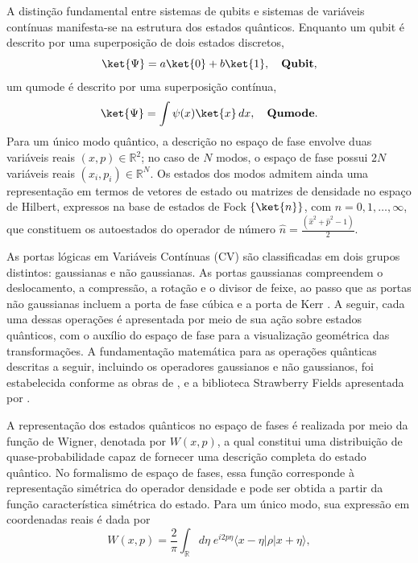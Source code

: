 A distinção fundamental entre sistemas de qubits e sistemas de variáveis contínuas manifesta-se na estrutura dos estados quânticos. Enquanto um qubit é descrito por uma superposição de dois estados discretos,
\begin{equation*}
    \ket{\Psi} = a\ket{0} + b\ket{1}, \quad \textbf{Qubit},
\end{equation*}
um qumode é descrito por uma superposição contínua,
\begin{equation*}
    \ket{\Psi} = \int \psi(x)\ket{x}\, dx, \quad \textbf{Qumode}.
\end{equation*}
Para um único modo quântico, a descrição no espaço de fase envolve duas variáveis reais $(x, p) \in \mathbb{R}^{2}$; no caso de $N$ modos, o espaço de fase possui $2N$ variáveis reais $(x_i, p_i) \in \mathbb{R}^{N}$. Os estados dos modos admitem ainda uma representação em termos de vetores de estado ou matrizes de densidade no espaço de Hilbert, expressos na base de estados de Fock $\{\ket{n}\}$, com $n = 0, 1, \ldots, \infty$, que constituem os autoestados do operador de número $\displaystyle\hat{n} = \frac{(\hat{x}^2 + \hat{p}^2 - 1)}{2}$.

As portas lógicas em Variáveis Contínuas (CV) são classificadas em dois grupos distintos: gaussianas e não gaussianas. As portas gaussianas compreendem o deslocamento, a compressão, a rotação e o divisor de feixe, ao passo que as portas não gaussianas incluem a porta de fase cúbica e a porta de Kerr \cite{fukui2022building, sharma2020characterizing, weedbrook2012gaussian, serafini_quantum_2023}. A seguir, cada uma dessas operações é apresentada por meio de sua ação sobre estados quânticos, com o auxílio do espaço de fase para a visualização geométrica das transformações. A fundamentação matemática para as operações quânticas descritas a seguir, incluindo os operadores gaussianos e não gaussianos, foi estabelecida conforme as obras de \textcite{de_lima_redes_nodate}, \textcite{serafini_quantum_2023} e a biblioteca Strawberry Fields apresentada por \textcite{killoran_strawberry_2019}.

A representação dos estados quânticos no espaço de fases é realizada por meio da função de Wigner, denotada por $W(x,p)$, a qual constitui uma distribuição de quase-probabilidade capaz de fornecer uma descrição completa do estado quântico. No formalismo de espaço de fases, essa função corresponde à representação simétrica do operador densidade e pode ser obtida a partir da função característica simétrica do estado. Para um único modo, sua expressão em coordenadas reais é dada por
\begin{equation}
W(x,p)=\frac{2}{\pi}\int_{\mathbb{R}} d\eta \; e^{i2p\eta} \langle x-\eta|\rho|x+\eta\rangle,
\end{equation}

